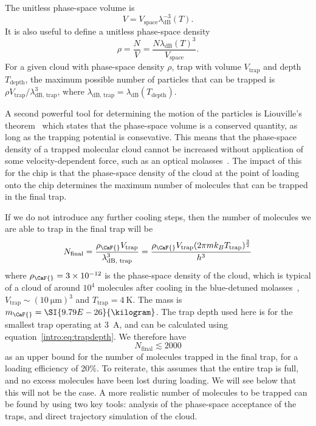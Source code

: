 The unitless phase-space volume is
%
\begin{equation}
  V = V_\text{space} \lambda_\text{dB}^{-3}(T).
\end{equation}
%
It is also useful to define a unitless phase-space
density~\cite{PhysRevA.52.1423}
%
\begin{equation}
  \rho = \frac{N}{V} = \frac{N \lambda_\text{dB}(T)^3}{V_\text{space}}.
\end{equation}
%
For a given cloud with phase-space density $\rho$, trap with volume
$V_\text{trap}$ and depth $T_\text{depth}$,
the maximum possible number of particles that can be trapped is $\rho
V_\text{trap}/\lambda_\text{dB, trap}^3$, where $\lambda_\text{dB, trap} =
\lambda_\text{dB}(T_\text{depth})$.

A second powerful tool for determining the motion of the particles is
Liouville's theorem~\cite{Landau1982, Hand1998} which states that the phase-space
volume is a conserved quantity, as long as the trapping potential is
consevative. This means that the phase-space density of a trapped molecular
cloud cannot be increased without application of some velocity-dependent
force, such as an optical molasses~\cite{Metcalf1999}. The impact of this for
the chip is that the phase-space density of the cloud at the point of loading
onto the chip determines the maximum number of molecules that can be trapped in
the final trap.

If we do not introduce any further cooling steps, then the number of molecules
we are able to trap in the final trap will be
%
\begin{equation}
  N_\text{final} = \frac{\rho_\text{\CaF{}}V_\text{trap}}
  {\lambda_\text{dB, trap}^3} = \frac{\rho_\text{\CaF{}} V_\text{trap}(2 \pi m k_B
  T_\text{trap})^\frac{3}{2}}{h^3}
  \label{design:eq:psd_N}
\end{equation}
%
where $\rho_\text{\CaF{}} = 3\times10^{-12}$ is the phase-space density of the
\CaF{} cloud, which is typical of a cloud of around $10^4$ molecules after
cooling in the blue-detuned molasses~\cite{Truppe2017},
$V_\text{trap}\sim(\SI{10}{\micro\meter})^3$ and
$T_\text{trap}=\SI{4}{\kelvin}$. The \CaF{} mass is
$m_\text{\CaF{}}=\SI{9.79E-26}{\kilogram}$. The trap depth used here is for the
smallest trap operating at \SI{3}{\ampere}, and can be calculated using
equation~\ref{intro:eq:trapdepth}. We therefore have
%
\begin{equation} N_\text{final} \lesssim 2000 \end{equation}
%
as an upper bound for the number of molecules trapped in the final trap, for a
loading efficiency of 20\%. To
reiterate, this assumes that the entire trap is full, and no excess molecules
have been lost during loading. We will see below that this will not be the
case. A more realistic number of molecules to be trapped can be found by using
two key tools: analysis of the phase-space acceptance of the traps, and direct
trajectory simulation of the cloud.

